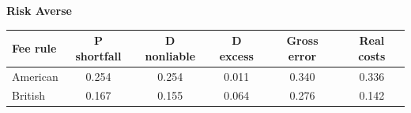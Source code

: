 \documentclass[10pt,border=5pt,varwidth=17cm]{standalone}
\begin{document}
\begingroup
\small
\setlength{\tabcolsep}{5pt}
\renewcommand{\arraystretch}{1.20}
\noindent\textbf{Risk Averse}\par\smallskip
\noindent\begin{tabularx}{\linewidth}{@{}>{\raggedright\arraybackslash}Xccccc@{}}
\toprule
\textbf{Fee rule} & \textbf{P shortfall} & \textbf{D nonliable} & \textbf{D excess} & \textbf{Gross error} & \textbf{Real costs} \\
\midrule
American & 0.254 & 0.254 & 0.011 & 0.340 & 0.336 \\
British & 0.167 & 0.155 & 0.064 & 0.276 & 0.142 \\
\bottomrule\end{tabularx}\par\medskip
\endgroup
\end{document}
